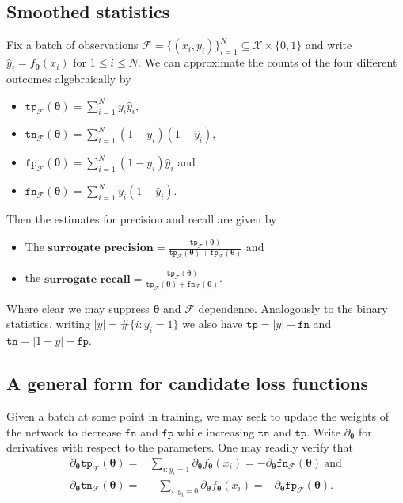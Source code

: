 \documentclass[10pt,a4paper]{article}
\begin{document}
\subsection{Smoothed statistics}

Fix a batch of observations $\mathcal F=\{(x_i,y_i)\}_{i=1}^N\subseteq\mathcal X\times\{0,1\}$ and write $\hat y_i=f_{\boldsymbol\theta}(x_i)$ for $1\leq i\leq N$.
We can approximate the counts of the four different outcomes algebraically by
\begin{itemize}
  \item $\texttt{tp}_\mathcal F(\boldsymbol\theta)=\sum_{i=1}^N y_i\hat y_i$,
  \item $\texttt{tn}_\mathcal F(\boldsymbol\theta)=\sum_{i=1}^N(1-y_i)(1-\hat y_i)$,
  \item $\texttt{fp}_\mathcal F(\boldsymbol\theta)=\sum_{i=1}^N(1-y_i)\hat y_i$ and
  \item $\texttt{fn}_\mathcal F(\boldsymbol\theta)=\sum_{i=1}^Ny_i(1-\hat y_i)$.
\end{itemize}

Then the estimates for precision and recall are given by
\begin{itemize}
  \item The $\textbf{surrogate precision}=\frac{\texttt{tp}_\mathcal F(\boldsymbol\theta)}{\texttt{tp}_\mathcal F(\boldsymbol\theta)+\texttt{fp}_\mathcal F(\boldsymbol\theta)}$ and
  \item the $\textbf{surrogate recall}=\frac{\texttt{tp}_\mathcal F(\boldsymbol\theta)}{\texttt{tp}_\mathcal F(\boldsymbol\theta)+\texttt{fn}_\mathcal F(\boldsymbol\theta)}$.
\end{itemize}
Where clear we may suppress $\boldsymbol\theta$ and $\mathcal F$ dependence.
Analogously to the binary statistics, writing $|y|=\#\{i:y_i=1\}$ we also have $\texttt{tp}=|y|-\texttt{fn}$ and $\texttt{tn}=|1-y|-\texttt{fp}$.
\subsection{A general form for candidate loss functions}
Given a batch at some point in training, we may seek to update the weights of the network to decrease $\texttt{fn}$ and $\texttt{fp}$ while increasing $\texttt{tn}$ and $\texttt{tp}$.
Write $\partial_{\boldsymbol\theta}$ for derivatives with respect to the parameters.
One may readily verify that
\begin{align*}
  \partial_{\boldsymbol\theta}\texttt{tp}_{\mathcal F}(\boldsymbol\theta)=&\sum_{i:y_i=1}\partial_{\boldsymbol\theta}f_{\boldsymbol\theta}(x_i)=-\partial_{\boldsymbol\theta}\texttt{fn}_{\mathcal F}(\boldsymbol\theta)~\text{and}\\
  \partial_{\boldsymbol\theta}\texttt{tn}_{\mathcal F}(\boldsymbol\theta)=&-\sum_{i:y_i=0}\partial_{\boldsymbol\theta}f_{\boldsymbol\theta}(x_i)=-\partial_{\boldsymbol\theta}\texttt{fp}_{\mathcal F}(\boldsymbol\theta).
\end{align*}
\end{document}
